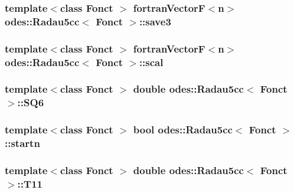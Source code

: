 \hypertarget{classodes_1_1Radau5cc_a060ca481b33c11ca111a49b25df64c80}{
\subsubsection[{save3}]{\setlength{\rightskip}{0pt plus 5cm}template$<$class Fonct $>$ {\bf fortran\-Vector\-F}$<${\bf n}$>$ {\bf odes\-::\-Radau5cc}$<$ Fonct $>$\-::save3\hspace{0.3cm}{\ttfamily [private]}}}\label{classodes_1_1Radau5cc_a060ca481b33c11ca111a49b25df64c80}
\hypertarget{classodes_1_1Radau5cc_a5f604f76403a66677e194915e2f2d8d8}{
\subsubsection[{scal}]{\setlength{\rightskip}{0pt plus 5cm}template$<$class Fonct $>$ {\bf fortran\-Vector\-F}$<${\bf n}$>$ {\bf odes\-::\-Radau5cc}$<$ Fonct $>$\-::scal\hspace{0.3cm}{\ttfamily [private]}}}\label{classodes_1_1Radau5cc_a5f604f76403a66677e194915e2f2d8d8}
\hypertarget{classodes_1_1Radau5cc_ab72c18864827bc09b414a8c01e956698}{
\subsubsection[{S\-Q6}]{\setlength{\rightskip}{0pt plus 5cm}template$<$class Fonct $>$ double {\bf odes\-::\-Radau5cc}$<$ Fonct $>$\-::S\-Q6\hspace{0.3cm}{\ttfamily [private]}}}\label{classodes_1_1Radau5cc_ab72c18864827bc09b414a8c01e956698}
\hypertarget{classodes_1_1Radau5cc_a04284948029a635e8d0d4ea79e15c5ea}{
\subsubsection[{startn}]{\setlength{\rightskip}{0pt plus 5cm}template$<$class Fonct $>$ bool {\bf odes\-::\-Radau5cc}$<$ Fonct $>$\-::startn\hspace{0.3cm}{\ttfamily [private]}}}\label{classodes_1_1Radau5cc_a04284948029a635e8d0d4ea79e15c5ea}
\hypertarget{classodes_1_1Radau5cc_a3538e815c4a1a4449692ef7cf5331fcc}{
\subsubsection[{T11}]{\setlength{\rightskip}{0pt plus 5cm}template$<$class Fonct $>$ double {\bf odes\-::\-Radau5cc}$<$ Fonct $>$\-::T11\hspace{0.3cm}{\ttfamily [private]}}}\label{classodes_1_1Radau5cc_a3538e815c4a1a4449692ef7cf5331fcc}
